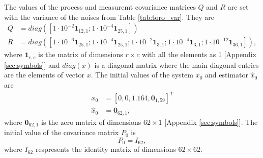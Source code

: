 The values of the process and measuremt covariance matrices $Q$ and $R$ are set with the variance of the noises from Table \ref{tab:toro_var}. They are 
$$  \begin{aligned}
         Q &= diag([1\cdot{10}^{-2} \textbf{1}_{12,1}; 1\cdot{10}^{-4} \textbf{1}_{25,1}])  \\
         R &= diag([1\cdot{10}^{-6} \textbf{1}_{25,1}; 1\cdot{10}^{-4}\textbf{1}_{25,1}; 1\cdot{10}^{-2}\textbf{1}_{3,1};1\cdot{10}^{-4}\textbf{1}_{3,1}; 1\cdot{10}^{-12}\textbf{1}_{36,1} ]),
     \end{aligned}$$
where $\textbf{1}_{r,c}$ is the matrix of dimensions $r \times c$ with all the elements as 1 [Appendix \ref{sec:symbols}] and $diag(x)$ is a diagonal matrix where the main diagonal entries are the elements of vector $x$. 
The initial values of the system $x_0$ and estimator $\hat x_0$ are
$$ \begin{aligned} x_0 &= [0,0,1.164,\textbf{0}_{1,59}]^T \\ \hat x_0 &= \textbf{0}_{62,1}, \end{aligned} $$  where $\textbf{0}_{62,1}$ is the zero matrix of dimensions $62 \times 1$ [Appendix \ref{sec:symbols}].
The initial value of the covariance matrix $P_0$ is $$ P_0 = I_{62},$$ where $I_{62}$ respresents the identity matrix of dimensions $62\times62$. 

